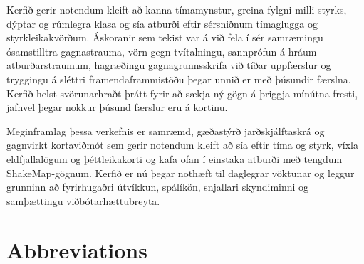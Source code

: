 \documentclass[12pt]{article}
\begin{document}
\begin{otherlanguage}{icelandic}
Kerfið gerir notendum kleift að kanna tímamynstur, greina fylgni milli styrks, dýptar og rúmlegra klasa og sía atburði eftir sérsniðnum tímaglugga og styrkleikakvörðum. Áskoranir sem tekist var á við fela í sér samræmingu ósamstilltra gagnastrauma, vörn gegn tvítalningu, sannprófun á hráum atburðarstraumum, hagræðingu gagnagrunnsskrifa við tíðar uppfærslur og tryggingu á sléttri framendaframmistöðu þegar unnið er með þúsundir færslna. Kerfið helst svörunarhraðt þrátt fyrir að sækja ný gögn á þriggja mínútna fresti, jafnvel þegar nokkur þúsund færslur eru á kortinu.

Meginframlag þessa verkefnis er samræmd, gæðastýrð jarðskjálftaskrá og gagnvirkt kortaviðmót sem gerir notendum kleift að sía eftir tíma og styrk, víxla eldfjallalögum og þéttleikakorti og kafa ofan í einstaka atburði með tengdum ShakeMap-gögnum. Kerfið er nú þegar nothæft til daglegrar vöktunar og leggur grunninn að fyrirhugaðri útvíkkun, spálíkön, snjallari skyndiminni og samþættingu viðbótarhættubreyta.
\end{otherlanguage}

\clearpage
\null
\thispagestyle{empty}
\newpage

\tableofcontents

\clearpage
\null
\thispagestyle{empty}
\newpage

\listoffigures

\clearpage
\null
\thispagestyle{empty}
\newpage

\listoftables

\clearpage
\null
\thispagestyle{empty}
\newpage

\section*{Abbreviations}
\end{document}
